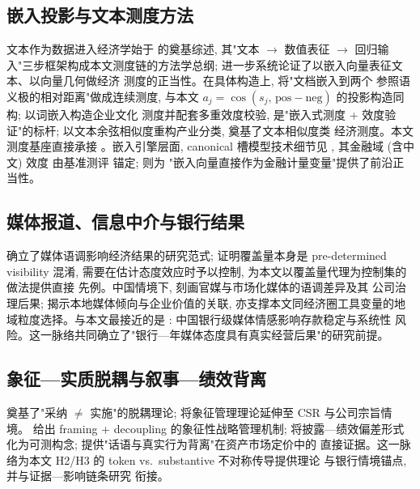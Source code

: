 \subsection{嵌入投影与文本测度方法}\label{sec:lit:embed}
文本作为数据进入经济学始于 \textcite{gentzkow2019text} 的奠基综述, 其"文本
$\to$ 数值表征 $\to$ 回归输入"三步框架构成本文测度链的方法学总纲;
\textcite{ash2023text} 进一步系统论证了以嵌入向量表征文本、以向量几何做经济
测度的正当性。在具体构造上, \textcite{gennaro2022emotion} 将"文档嵌入到两个
参照语义极的相对距离"做成连续测度, 与本文 $a_j=\cos(s_j,\,\mathrm{pos}-
\mathrm{neg})$ 的投影构造同构; \textcite{li2021culture} 以词嵌入构造企业文化
测度并配套多重效度校验, 是"嵌入式测度 + 效度验证"的标杆;
\textcite{hoberg2016text} 以文本余弦相似度重构产业分类, 奠基了文本相似度类
经济测度。本文测度基座直接承接 \textcite{jha2026benefit}。嵌入引擎层面,
canonical 槽模型技术细节见 \textcite{zhang2025qwen3}, 其金融域 (含中文) 效度
由基准测评 \parencite{tang2025finmteb} 锚定; \textcite{gabaix2025asset} 则为
"嵌入向量直接作为金融计量变量"提供了前沿正当性。

\subsection{媒体报道、信息中介与银行结果}\label{sec:lit:media}
\textcite{tetlock2007content} 确立了媒体语调影响经济结果的研究范式;
\textcite{fang2009media} 证明覆盖量本身是 pre-determined visibility 混淆,
需要在估计态度效应时予以控制, 为本文以覆盖量代理为控制集的做法提供直接
先例。中国情境下, \textcite{you2018pen} 刻画官媒与市场化媒体的语调差异及其
公司治理后果; \textcite{gurun2012hype} 揭示本地媒体倾向与企业价值的关联,
亦支撑本文同经济圈工具变量的地域粒度选择。与本文最接近的是
\textcite{fang2024mediasentiment}: 中国银行级媒体情感影响存款稳定与系统性
风险。这一脉络共同确立了"银行—年媒体态度具有真实经营后果"的研究前提。

\subsection{象征—实质脱耦与叙事—绩效背离}\label{sec:lit:decouple}
\textcite{westphal1994substance} 奠基了"采纳 $\neq$ 实施"的脱耦理论;
\textcite{westphal2023systemic} 将象征管理理论延伸至 CSR 与公司宗旨情境。
\textcite{fiss2006symbolic} 给出 framing + decoupling 的象征性战略管理机制;
\textcite{kim2015greenwash} 将披露—绩效偏差形式化为可测构念;
\textcite{duchin2025greenwashing} 提供"话语与真实行为背离"在资产市场定价中的
直接证据。这一脉络为本文 H2/H3 的 token vs.\ substantive 不对称传导提供理论
与银行情境锚点, 并与证据—影响链条研究 \parencite{distel2026evidence} 衔接。

